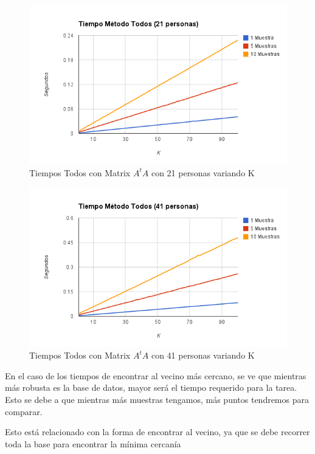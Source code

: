 \begin{figure}[H]
\includegraphics[width=1\textwidth]{img/image5.png}
     \caption{Tiempos Todos con Matrix $A^tA$ con 21 personas variando K}
\end{figure}

\begin{figure}[H]
\includegraphics[width=1\textwidth]{img/image6.png}
     \caption{Tiempos Todos con Matrix $A^tA$ con 41 personas variando K}
\end{figure}

En el caso de los tiempos de encontrar al vecino más cercano, se ve que mientras m\'as robusta es la
base de datos, mayor será el tiempo requerido para la tarea. Esto se debe a que mientras m\'as
muestras tengamos, m\'as puntos tendremos para comparar.

Esto est\'a relacionado con la forma de encontrar al vecino, ya que se debe recorrer toda la base
para encontrar la m\'inima cercan\'ia

\newpage

